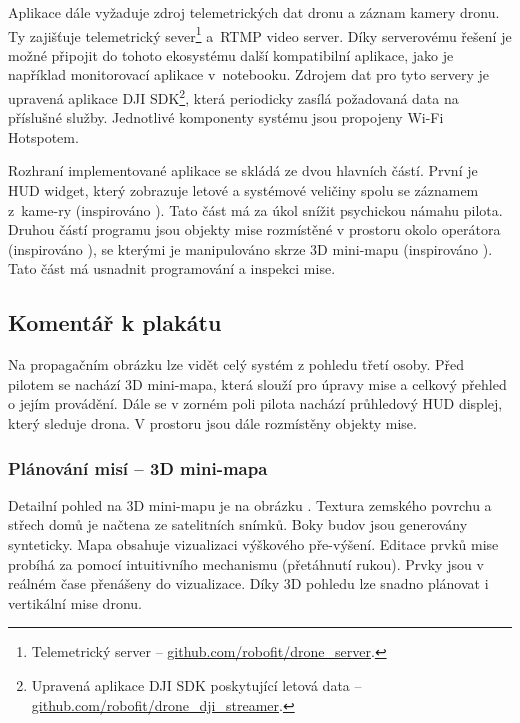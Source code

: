 \documentclass[czech]{ExcelAtFIT} %
\begin{document}
Aplikace dále vyžaduje zdroj telemetrických dat dronu a záznam kamery dronu. Ty zajišťuje telemetrický sever\footnote{Telemetrický server --  \href{https://github.com/robofit/drone\_server}{github.com/robofit/drone\_server}.} a~RTMP video server. Díky serverovému řešení je možné připojit do tohoto ekosystému další kompatibilní aplikace, jako je například monitorovací aplikace v~notebooku. Zdrojem dat pro tyto servery je upravená aplikace DJI SDK\footnote{Upravená aplikace DJI SDK poskytující letová data -- \href{https://github.com/robofit/drone\_dji\_streamer}{github.com/robofit/drone\_dji\_streamer}.}, která periodicky zasílá požadovaná data na příslušné služby. Jednotlivé komponenty systému jsou propojeny Wi-Fi Hotspotem. 

Rozhraní implementované aplikace se skládá ze dvou hlavních částí. První je HUD widget, který zobrazuje letové a systémové veličiny spolu se záznamem z~kame-ry (inspirováno \cite{hedayati2018improving, konstantoudakis2022drone}). Tato část má za úkol snížit psychickou námahu pilota.  Druhou částí programu jsou objekty mise rozmístěné v prostoru okolo operátora (inspirováno \cite{zollmann2014flyar}), se kterými je manipulováno skrze 3D mini-mapu (inspirováno \cite{li2015flying,liu2018usability}). Tato část má usnadnit programování a inspekci mise.

\subsection{Komentář k plakátu}
Na propagačním obrázku   lze vidět celý systém z pohledu třetí osoby. Před pilotem se nachází 3D mini-mapa, která slouží pro úpravy mise a celkový přehled o jejím provádění. Dále se v zorném poli pilota nachází průhledový HUD displej, který sleduje drona. V prostoru jsou  dále rozmístěny objekty mise.

\subsubsection*{Plánování misí -- 3D mini-mapa}
Detailní pohled na 3D mini-mapu je na obrázku . Textura zemského povrchu a střech domů je načtena ze  satelitních snímků. Boky budov jsou generovány synteticky. Mapa obsahuje vizualizaci výškového pře-výšení. Editace prvků mise probíhá za pomocí intuitivního  mechanismu (přetáhnutí rukou). Prvky jsou v reálném čase přenášeny do  vizualizace. Díky 3D pohledu lze snadno plánovat i vertikální mise dronu.
\end{document}
